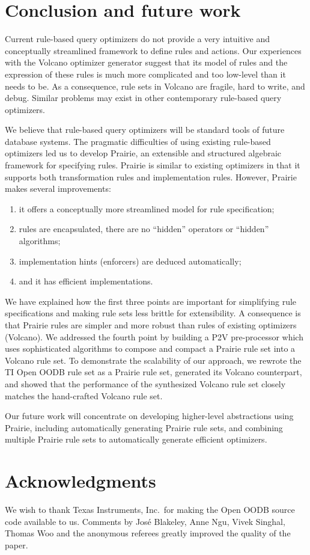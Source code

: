 \section{Conclusion and future work}
\label{sec:conclusion}

Current rule-based query optimizers do not provide a very intuitive and
conceptually streamlined framework to define rules and actions.  Our
experiences with the Volcano optimizer generator suggest that its model
of rules and the expression of these rules is much more complicated and
too low-level than it needs to be.  As a consequence, rule sets in
Volcano are fragile, hard to write, and debug.  Similar problems may
exist in other contemporary rule-based query optimizers.

We believe that rule-based query optimizers will be standard tools
of future database systems.  The pragmatic difficulties of using
existing rule-based optimizers led us to develop Prairie, an
extensible and structured algebraic framework for specifying rules.
Prairie is similar to existing optimizers in that it supports both
transformation rules and implementation rules.  However, Prairie
makes several improvements:
\begin{enumerate}
\item it offers a conceptually more streamlined model for rule specification;
\item rules are encapsulated, there are no ``hidden'' operators or
      ``hidden'' algorithms;
\item implementation hints (\eg enforcers) are deduced automatically;
\item and it has efficient implementations.
\end{enumerate}

We have explained how the first three points are important for
simplifying rule specifications and making rule sets less brittle for
extensibility.  A consequence is that Prairie rules are simpler and
more robust than rules of existing optimizers (\eg Volcano).  We
addressed the fourth point by building a P2V pre-processor which uses
sophisticated algorithms to compose and compact a Prairie rule set into
a Volcano rule set.  To demonstrate the scalability of our approach, we
rewrote the TI Open OODB rule set as a Prairie rule set, generated its
Volcano counterpart, and showed that the performance of the synthesized
Volcano rule set closely matches the hand-crafted Volcano rule set.

Our future work will concentrate on developing higher-level
abstractions using Prairie, including automatically generating Prairie
rule sets, and combining multiple Prairie rule sets to automatically
generate efficient optimizers.

\section*{Acknowledgments}
\label{sec:acknowledgments}

We wish to thank Texas Instruments, Inc.\ for making the Open OODB
source code available to us.  Comments by Jos\'e Blakeley, Anne Ngu,
Vivek Singhal, Thomas Woo and the anonymous referees greatly improved
the quality of the paper.
